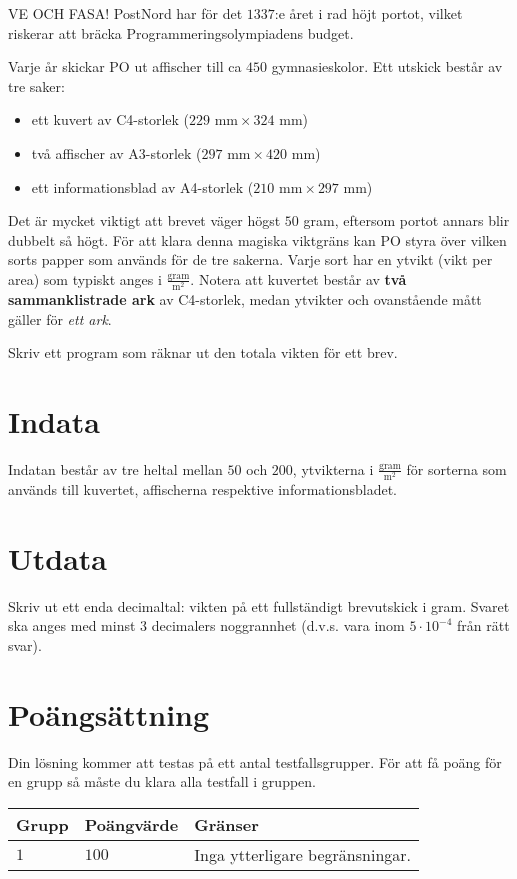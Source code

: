 VE OCH FASA!
PostNord har för det $1337$:e året i rad höjt portot, vilket riskerar att bräcka Programmeringsolympiadens budget.

Varje år skickar PO ut affischer till ca $450$ gymnasieskolor.
Ett utskick består av tre saker: 
\begin{itemize}
\item ett kuvert av C4-storlek ($229\text{ mm} \times 324\text{ mm}$)
\item två affischer av A3-storlek ($297\text{ mm} \times 420\text{ mm}$)
\item ett informationsblad av A4-storlek ($210\text{ mm} \times 297\text{ mm}$)
\end{itemize}

Det är mycket viktigt att brevet väger högst $50$ gram, eftersom portot annars blir dubbelt så högt.
För att klara denna magiska viktgräns kan PO styra över vilken sorts papper som används för de tre sakerna.
Varje sort har en ytvikt (vikt per area) som typiskt anges i $\frac{\text{gram}}{\text{m}^2}$.
Notera att kuvertet består av \textbf{två sammanklistrade ark} av C4-storlek, medan ytvikter och ovanstående mått gäller för \emph{ett ark}.

Skriv ett program som räknar ut den totala vikten för ett brev.

\section*{Indata}
Indatan består av tre heltal mellan $50$ och $200$, ytvikterna i $\frac{\text{gram}}{\text{m}^2}$ för sorterna som används till kuvertet, affischerna respektive informationsbladet.

\section*{Utdata}
Skriv ut ett enda decimaltal: vikten på ett fullständigt brevutskick i gram.
Svaret ska anges med minst $3$ decimalers noggrannhet (d.v.s. vara inom $5 \cdot 10^{-4}$ från rätt svar).

\section*{Poängsättning}
Din lösning kommer att testas på ett antal testfallsgrupper.
För att få poäng för en grupp så måste du klara alla testfall i gruppen.

\noindent
\begin{tabular}{| l | l | l |}
  \hline
  Grupp & Poängvärde & Gränser \\ \hline
  $1$   & $100$        & Inga ytterligare begränsningar. \\ \hline
\end{tabular}

